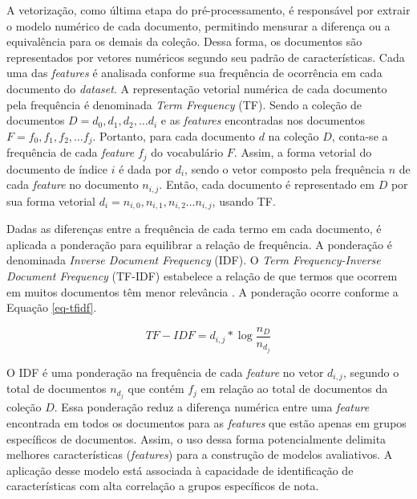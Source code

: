 A vetorização, como última etapa do pré-processamento, é responsável por extrair o modelo numérico de cada documento, permitindo mensurar a diferença ou a equivalência para os demais da coleção. Dessa forma, os documentos são representados por vetores numéricos segundo seu padrão de características. Cada uma das \textit{features} é analisada conforme sua frequência de ocorrência em cada documento do \textit{dataset}. A representação vetorial numérica de cada documento pela frequência é denominada \textit{Term Frequency} (TF). Sendo a coleção de documentos $ D = { d_{0}, d_{1}, d_{2}, \hdots d_{i} } $ e as \textit{features} encontradas nos documentos $ F = { f_{0}, f_{1}, f_{2}, \hdots f_{j} } $.  Portanto, para cada documento $ d $ na coleção $ D $, conta-se a frequência de cada \textit{feature} $ f_{j} $ do vocabulário $ F $. Assim, a forma vetorial do documento de índice $ i $ é dada por $ d_{i} $, sendo o vetor composto pela frequência $ n $ de cada \textit{feature} no documento $ n_{i, j} $. Então, cada documento é representado em $ D $ por sua forma vetorial $ d_{i} = { n_{i, 0}, n_{i, 1}, n_{i, 2} \hdots n_{i,j}} $, usando TF.

Dadas as diferenças entre a frequência de cada termo em cada documento, é aplicada a ponderação para equilibrar a relação de frequência. A ponderação é denominada \textit{Inverse Document Frequency} (IDF). O \textit{Term Frequency-Inverse Document Frequency} (TF-IDF) estabelece a relação de que termos que ocorrem em muitos documentos têm menor relevância \cite{baeza2011}. A ponderação ocorre conforme a Equação \ref{eq-tfidf}.

\begin{equation}
TF-IDF = d_{i,j}* \log \frac{n_{D}}{n_{d_{j}}}
\label{eq-tfidf}
\end{equation}

O IDF é uma ponderação na frequência de cada \textit{feature} no vetor $ d_{i, j} $, segundo o total de documentos $ n_{d_{j}} $ que contém $ f_{j} $ em relação ao total de documentos da coleção $ D $. Essa ponderação reduz a diferença numérica entre uma \textit{feature} encontrada em todos os documentos para as \textit{features} que estão apenas em grupos específicos de documentos. Assim, o uso dessa forma potencialmente delimita melhores características (\textit{features}) para a construção de modelos avaliativos. A aplicação desse modelo está associada à capacidade de identificação de características com alta correlação a grupos específicos de nota.

